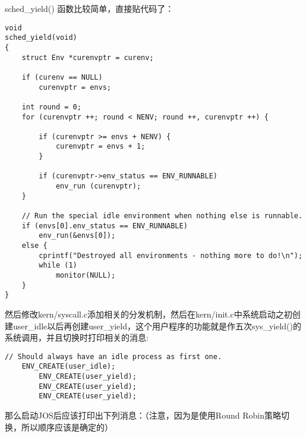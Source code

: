 \documentclass{article}
\newcommand{\funcname}[1]{{\ttfamily \small #1}}
\begin{document}
\begin{CJK*}{UTF8}{gkai}
\funcname{sched\_yield()} 函数比较简单，直接贴代码了：

\begin{lstlisting}[style=ccode, title={\scriptsize \ttfamily \bfseries kern/sched.c: sched\_yield()}]
void
sched_yield(void)
{
    struct Env *curenvptr = curenv;

    if (curenv == NULL)
        curenvptr = envs;

    int round = 0;
    for (curenvptr ++; round < NENV; round ++, curenvptr ++) {

        if (curenvptr >= envs + NENV) {
            curenvptr = envs + 1;
        }

        if (curenvptr->env_status == ENV_RUNNABLE)
            env_run (curenvptr);
    }

    // Run the special idle environment when nothing else is runnable.
    if (envs[0].env_status == ENV_RUNNABLE)
        env_run(&envs[0]);
    else {
        cprintf("Destroyed all environments - nothing more to do!\n");
        while (1)
            monitor(NULL);
	}
}
\end{lstlisting}

然后修改kern/syscall.c添加相关的分发机制，然后在kern/init.c中系统启动之初创建user\_idle以后再创建user\_yield，这个用户程序的功能就是作五次\funcname{sys\_yield()}的系统调用，并且切换时打印相关的消息:

\begin{lstlisting}[style=ccode, title={\scriptsize \ttfamily \bfseries kern/init.c: i386\_init()}]
	// Should always have an idle process as first one.
	ENV_CREATE(user_idle);
        ENV_CREATE(user_yield);
        ENV_CREATE(user_yield);
        ENV_CREATE(user_yield);
\end{lstlisting}

那么启动JOS后应该打印出下列消息：（注意，因为是使用Round Robin策略切换，所以顺序应该是确定的）



\end{CJK*}
\end{document}
